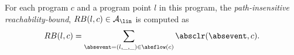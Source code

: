 \begin{defn}
  \label{def:pathinsensitive_rb}
  For each program ${c}$ and a program point $l$ in this program,
   the \emph{path-insensitive reachability-bound},
  $RB(l, c) \in \mathcal{A}_{\lin}$ is computed as
\[ 
  RB(l, c) = \sum\limits_{\absevent = (l, \_, \_) \in \absflow(c)} \absclr(\absevent, c).
  \]
\end{defn}
